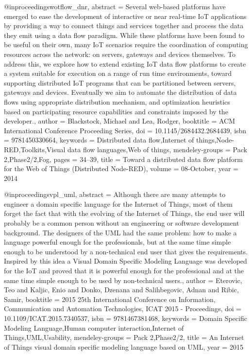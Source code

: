 @inproceedings{wotflow_dnr,
    abstract = {Several web-based platforms have emerged to ease the development of interactive or near real-time IoT applications by providing a way to connect things and services together and process the data they emit using a data flow paradigm. While these platforms have been found to be useful on their own, many IoT scenarios require the coordination of computing resources across the network: on servers, gateways and devices themselves. To address this, we explore how to extend existing IoT data flow platforms to create a system suitable for execution on a range of run time environments, toward supporting distributed IoT programs that can be partitioned between servers, gateways and devices. Eventually we aim to automate the distribution of data flows using appropriate distribution mechanism, and optimization heuristics based on participating resource capabilities and constraints imposed by the developer.},
    author = {Blackstock, Michael and Lea, Rodger},
    booktitle = {ACM International Conference Proceeding Series},
    doi = {10.1145/2684432.2684439},
    isbn = {9781450330664},
    keywords = {Distributed data flow,Internet of things,Node-RED,Toolkits,Visual data flow languages,Web of things},
    mendeley-groups = {Pack 2,Phase2/2,Fog},
    pages = {34--39},
    title = {{Toward a distributed data flow platform for the Web of Things (Distributed Node-RED)}},
    volume = {08-October},
    year = {2014}
}

@inproceedings{vpl_uml,
    abstract = {Although there are many attempts to engineer a domain specific language for the Internet of Things, most of them forget the fact that with the evolving of the Internet of Things, the end user will probably be a common person without an engineering or software development background. The designers of the UML had the same problem: how to make a language powerful enough for the professionals, but at the same time simple enough to be understood by a non-technical end user that gives the requirements. Inspired by this idea a Visual Domain Specific Modeling Language was developed for the IoT and proved that it is powerful enough for the professional and at the same time simple enough to be used by non-technical users.},
    author = {Eterovic, Teo and Kaljic, Enio and Donko, Dzenana and Salihbegovic, Adnan and Ribic, Samir},
    booktitle = {2015 25th International Conference on Information, Communication and Automation Technologies, ICAT 2015 - Proceedings},
    doi = {10.1109/ICAT.2015.7340537},
    isbn = {9781467381468},
    keywords = {Domain Specific Modeling Language,Human computer interaction,Internet of Things,UML,Usability},
    mendeley-groups = {Pack 2,Phase2/2},
    title = {{An Internet of Things visual domain specific modeling language based on UML}},
    year = {2015}
}

